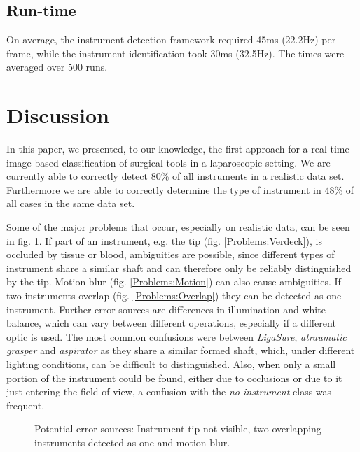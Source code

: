 \documentclass{llncs}
\begin{document}
\subsection{Run-time}
On average, the instrument detection framework required 45ms (22.2Hz) per frame, while the instrument identification took 30ms (32.5Hz).
The times were averaged over 500 runs.
\section{Discussion}
In this paper, we presented, to our knowledge, the first approach for a real-time image-based classification of surgical tools in a laparoscopic setting.
We are currently able to correctly detect 80\% of all instruments in a realistic data set.
Furthermore we are able to correctly determine the type of instrument in 48\% of all cases in the same data set.

Some of the major problems that occur, especially on realistic data, can be seen in fig. \ref{Problems}.
If part of an instrument, e.g. the tip (fig. \ref{Problems:Verdeck}), is occluded by tissue or blood, ambiguities are possible, since different types of instrument share a similar shaft and can therefore only be reliably distinguished by the tip.
Motion blur (fig. \ref{Problems:Motion}) can also cause ambiguities.
If two instruments overlap (fig. \ref{Problems:Overlap}) they can be detected as one instrument.
Further error sources are differences in illumination and white balance, which can vary between different operations, especially if a different optic is used.
The most common confusions were between \textit{LigaSure}, \textit{atraumatic grasper} and \textit{aspirator} as they share a similar formed shaft, which, under different lighting conditions, can be difficult to distinguished.
Also, when only a small portion of the instrument could be found, either due to occlusions or due to it just entering the field of view, a confusion with the \textit{no instrument} class was frequent.
\begin{figure}[tb]

\caption{Potential error sources:  Instrument tip not visible,  two overlapping instruments detected as one and  motion blur.}

\label{Problems}
\end{figure}
\end{document}
